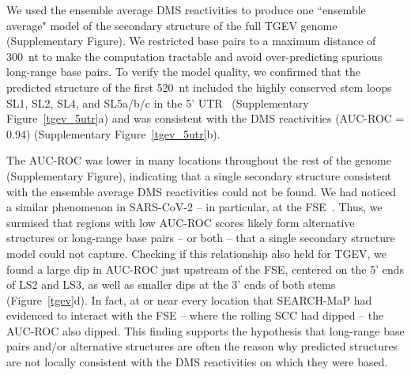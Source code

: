 \documentclass[main.tex]{subfiles}
\begin{document}
We used the ensemble average DMS reactivities to produce one ``ensemble average" model of the secondary structure of the full TGEV genome (Supplementary Figure).
We restricted base pairs to a maximum distance of 300~nt to make the computation tractable and avoid over-predicting spurious long-range base pairs.
To verify the model quality, we confirmed that the predicted structure of the first 520~nt included the highly conserved stem loops SL1, SL2, SL4, and SL5a/b/c in the 5' UTR~\cite{Yang2015a} (Supplementary Figure~\ref{tgev_5utr}a) and was consistent with the DMS reactivities (AUC-ROC = 0.94) (Supplementary Figure~\ref{tgev_5utr}b).

The AUC-ROC was lower in many locations throughout the rest of the genome (Supplementary Figure), indicating that a single secondary structure consistent with the ensemble average DMS reactivities could not be found.
We had noticed a similar phenomenon in SARS-CoV-2 -- in particular, at the FSE~\cite{Lan2022}.
Thus, we surmised that regions with low AUC-ROC scores likely form alternative structures or long-range base pairs -- or both -- that a single secondary structure model could not capture.
Checking if this relationship also held for TGEV, we found a large dip in AUC-ROC just upstream of the FSE, centered on the 5' ends of LS2 and LS3, as well as smaller dips at the 3' ends of both stems (Figure~\ref{tgev}d).
In fact, at or near every location that SEARCH-MaP had evidenced to interact with the FSE -- where the rolling SCC had dipped -- the AUC-ROC also dipped.
This finding supports the hypothesis that long-range base pairs and/or alternative structures are often the reason why predicted structures are not locally consistent with the DMS reactivities on which they were based.
\end{document}
